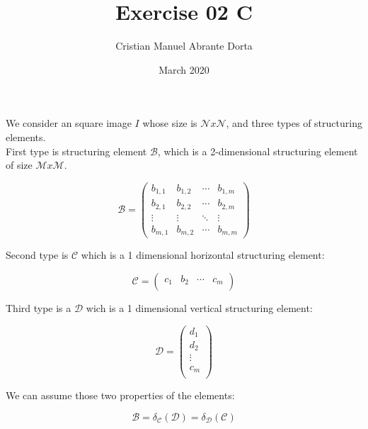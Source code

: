 \documentclass{article}
\title{Exercise 02 C}
\author{Cristian Manuel Abrante Dorta}
\date{March 2020}
\begin{document}
\maketitle

We consider an square image $I$ whose size is $\mathcal{N}x\mathcal{N}$, and three types of structuring elements. \\

First type is structuring element $\mathcal{B}$, which is a 2-dimensional structuring element of size $\mathcal{M}x\mathcal{M}$.

\begin{equation}
    \mathcal{B} = 
        \begin{pmatrix}
            b_{1,1} & b_{1,2} & \cdots & b_{1,m} \\
            b_{2,1} & b_{2,2} & \cdots & b_{2,m} \\
            \vdots  & \vdots  & \ddots & \vdots  \\
            b_{m,1} & b_{m,2} & \cdots & b_{m,m} 
        \end{pmatrix}
\end{equation}

Second type is $\mathcal{C}$ which is a 1 dimensional horizontal structuring element:

\begin{equation}
    \mathcal{C} = 
        \begin{pmatrix}
            c_{1} & b_{2} & \cdots & c_{m} \\
        \end{pmatrix}
\end{equation}

Third type is a $\mathcal{D}$ wich is a 1 dimensional vertical structuring element:

\begin{equation}
    \mathcal{D} = 
        \begin{pmatrix}
            d_{1} \\
            d_{2} \\ 
            \vdots\\
            c_{m} \\
        \end{pmatrix}
\end{equation}

We can assume those two properties of the elements:

\begin{equation}
    \mathcal{B} = \delta_{\mathcal{C}}(\mathcal{D}) = \delta_{\mathcal{D}}(\mathcal{C})
\end{equation}
\end{document}
